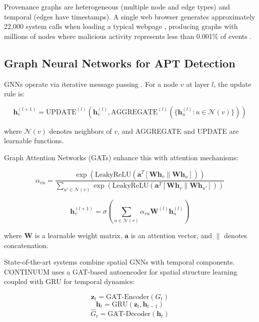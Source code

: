 \documentclass[conference]{IEEEtran}
\begin{document}
Provenance graphs are heterogeneous (multiple node and edge types) and temporal (edges have timestamps). A single web browser generates approximately 22,000 system calls when loading a typical webpage \cite{beep}, producing graphs with millions of nodes where malicious activity represents less than 0.001\% of events \cite{optic_dataset}.

\subsection{Graph Neural Networks for APT Detection}

GNNs operate via iterative message passing \cite{mpnn}. For a node $v$ at layer $l$, the update rule is:

\begin{equation}
\mathbf{h}_v^{(l+1)} = \text{UPDATE}^{(l)}\left(\mathbf{h}_v^{(l)}, \text{AGGREGATE}^{(l)}\left(\{\mathbf{h}_u^{(l)} : u \in \mathcal{N}(v)\}\right)\right)
\end{equation}

where $\mathcal{N}(v)$ denotes neighbors of $v$, and AGGREGATE and UPDATE are learnable functions.

Graph Attention Networks (GATs) \cite{gat} enhance this with attention mechanisms:

\begin{equation}
\alpha_{vu} = \frac{\exp\left(\text{LeakyReLU}\left(\mathbf{a}^T [\mathbf{W}\mathbf{h}_v \| \mathbf{W}\mathbf{h}_u]\right)\right)}{\sum_{u' \in \mathcal{N}(v)} \exp\left(\text{LeakyReLU}\left(\mathbf{a}^T [\mathbf{W}\mathbf{h}_v \| \mathbf{W}\mathbf{h}_{u'}]\right)\right)}
\end{equation}

\begin{equation}
\mathbf{h}_v^{(l+1)} = \sigma\left(\sum_{u \in \mathcal{N}(v)} \alpha_{vu} \mathbf{W}^{(l)} \mathbf{h}_u^{(l)}\right)
\end{equation}

where $\mathbf{W}$ is a learnable weight matrix, $\mathbf{a}$ is an attention vector, and $\|$ denotes concatenation.

State-of-the-art systems combine spatial GNNs with temporal components. CONTINUUM \cite{continuum} uses a GAT-based autoencoder for spatial structure learning coupled with GRU for temporal dynamics:

\begin{equation}
\mathbf{z}_t = \text{GAT-Encoder}(G_t)
\end{equation}
\begin{equation}
\mathbf{h}_t = \text{GRU}(\mathbf{z}_t, \mathbf{h}_{t-1})
\end{equation}
\begin{equation}
\hat{G}_t = \text{GAT-Decoder}(\mathbf{h}_t)
\end{equation}
\end{document}
